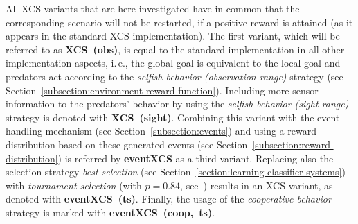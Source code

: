 All XCS variants that are here investigated have in common that the corresponding scenario will not be restarted, if a positive reward is attained (as it appears in the standard XCS implementation). The first variant, which will be referred to as \textbf{XCS~(obs)}, is equal to the standard implementation in all other implementation aspects, i.\,e., the global goal is equivalent to the local goal and predators act according to the \emph{selfish behavior (observation range)} strategy (see Section~\ref{subsection:environment-reward-function}). Including more sensor information to the predators' behavior by using the \emph{selfish behavior (sight range)} strategy is denoted with \textbf{XCS~(sight)}. Combining this variant with the event handling mechanism (see Section~\ref{subsection:events}) and using a reward distribution based on these generated events (see Section~\ref{subsection:reward-distribution}) is referred by \textbf{eventXCS} as a third variant. Replacing also the selection strategy \emph{best selection} (see Section~\ref{section:learning-classifier-systems}) with \emph{tournament selection} (with $p = 0.84$, see~\cite{Butz2003}) results in an XCS variant, as denoted with \textbf{eventXCS~(ts)}. Finally, the usage of the \emph{cooperative behavior} strategy is marked with \textbf{eventXCS~(coop,~ts)}.



